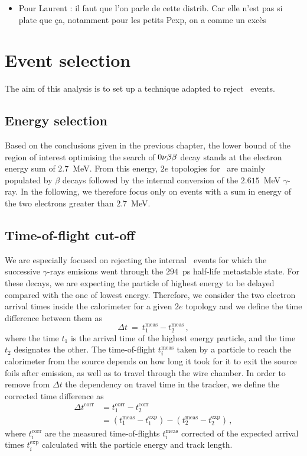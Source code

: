 \begin{itemize}
\item Pour Laurent : il faut que l'on parle de cette distrib. Car elle n'est pas si plate que ça, notamment pour les petits Pexp, on a comme un excès
\end{itemize}


\section{Event selection}

The aim of this analysis is to set up a technique adapted to reject \Tl\ events.

\subsection{Energy selection}

Based on the conclusions given in the previous chapter, the lower bound of the region of interest optimising the search of $0\nu\beta\beta$ decay stands at the electron energy sum of $2.7$~MeV.
From this energy, $2e$ topologies for \Tl\ are mainly populated by $\beta$ decays followed by the internal conversion of the $2.615$~MeV $\gamma$-ray.
In the following, we therefore focus only on events with a sum in energy of the two electrons greater than $2.7$~MeV.

\subsection{Time-of-flight cut-off}

We are especially focused on rejecting the internal \Tl\ events for which the successive $\gamma$-rays emisions went through the $294$~ps half-life metastable state.
For these decays, we are expecting the particle of highest energy to be delayed compared with the one of lowest energy.
Therefore, we consider the two electron arrival times inside the calorimeter for a given $2e$ topology and we define the time difference between them as
\begin{equation}
\Delta t~=~t^{\text{meas}}_{1}-t^{\text{meas}}_{2}\,,
\end{equation}
where the time $t_{1}$ is the arrival time of the highest energy particle, and the time $t_{2}$ designates the other.
The time-of-flight $t_{i}^{\text{meas}}$ taken by a particle to reach the calorimeter from the source depends on how long it took for it to exit the source foils after emission, as well as to travel through the wire chamber.
In order to remove from $\Delta t$ the dependency on travel time in the tracker, we define the corrected time difference as
\begin{align}
  \Delta t^{\text{corr}} & = t^{\text{corr}}_{1} - t^{\text{corr}}_{2}\\
  & = (t^{\text{meas}}_{1} - t^{\text{exp}}_{1}) - (t^{\text{meas}}_{2} - t^{\text{exp}}_{2})\,,
\end{align}
where $t^{\text{corr}}_{i}$ are the measured time-of-flights $t^{\text{meas}}_{i}$ corrected of the expected arrival times $t^{\text{exp}}_{i}$ calculated with the particle energy and track length.


